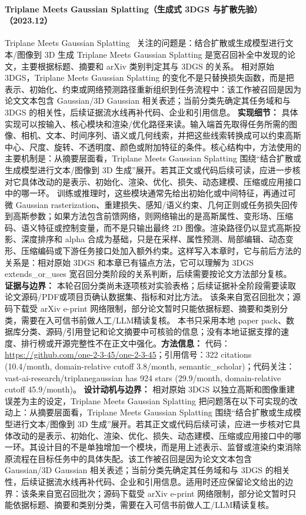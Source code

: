\paragraph{Triplane Meets Gaussian Splatting（生成式 3DGS 与扩散先验）（2023.12）}
Triplane Meets Gaussian Splatting~\cite{2312_09147} 关注的问题是：结合扩散或生成模型进行文本/图像到 3D 生成 Triplane Meets Gaussian Splatting 是宽召回补全中发现的论文，主要根据标题、摘要和 arXiv 类别判定其与 3DGS 的关系。
相对原始 3DGS，Triplane Meets Gaussian Splatting 的变化不是只替换损失函数，而是把表示、初始化、约束或网络预测路径重新组织到任务流程中：该工作被召回是因为论文文本包含 Gaussian/3D Gaussian 相关表述；当前分类先确定其任务域和与 3DGS 的相关性，后续证据流水线再补代码、企业和引用信息。
\textbf{实现细节：} 具体实现可以按输入、核心模块和渲染/优化路径来读。输入端首先取得任务所需的图像、相机、文本、时间序列、语义或几何线索，并把这些线索转换成可以约束高斯中心、尺度、旋转、不透明度、颜色或附加特征的条件。核心结构中，方法使用的主要机制是：从摘要层面看，Triplane Meets Gaussian Splatting 围绕“结合扩散或生成模型进行文本/图像到 3D 生成”展开。若其正文或代码后续可读，应进一步核对它具体改动的是表示、初始化、渲染、优化、损失、动态建模、压缩或应用接口中的哪一环。 训练或推理时，这些模块通常先给出初始化或中间特征，再通过可微 Gaussian rasterization、重建损失、感知/语义约束、几何正则或任务损失回传到高斯参数；如果方法包含前馈网络，则网络输出的是高斯属性、变形场、压缩码、语义特征或控制变量，而不是只输出最终 2D 图像。渲染路径仍以显式高斯投影、深度排序和 alpha 合成为基础，只是在采样、属性预测、局部编辑、动态变形、压缩编码或下游任务接口处加入额外约束。这样写入本章时，它与前后方法的关系是：相对原始 3DGS 和本章已有锚点方法，它可以理解为 3DGS extends\_or\_uses 宽召回分类阶段的关系判断，后续需要按论文方法部分复核。
\textbf{证据与边界：} 本轮召回分类尚未逐项核对实验表格；后续证据补全阶段需要读取论文源码/PDF或项目页确认数据集、指标和对比方法。 该条来自宽召回批次；源码下载受 arXiv e-print 网络限制，部分论文暂时只能依据标题、摘要和类别分类，需要在入可信书前做人工/LLM精读复核。 本书只采用本地 paper pack、数据库分类、源码/引用登记和论文摘要中可核验的信息；没有本地证据支撑的速度、排行榜或开源完整性不在正文中强化。\textbf{方法信息：} 代码：\url{https://github.com/one-2-3-45/one-2-3-45}；引用信号：322 citations (10.4/month, domain-relative cutoff 3.8/month, semantic\_scholar)；代码关注：vast-ai-research/triplanegaussian has 924 stars (29.9/month, domain-relative cutoff 45.9/month)。
\textbf{设计动机与边界：} 相对原始 3DGS 以独立高斯和图像重建误差为主的设定，Triplane Meets Gaussian Splatting 把问题落在以下可实现的改动上：从摘要层面看，Triplane Meets Gaussian Splatting 围绕“结合扩散或生成模型进行文本/图像到 3D 生成”展开。若其正文或代码后续可读，应进一步核对它具体改动的是表示、初始化、渲染、优化、损失、动态建模、压缩或应用接口中的哪一环。其设计目的不是单独增加一个模块，而是用上述表示、监督或渲染约束消除原流程在目标任务中的具体失配。该工作被召回是因为论文文本包含 Gaussian/3D Gaussian 相关表述；当前分类先确定其任务域和与 3DGS 的相关性，后续证据流水线再补代码、企业和引用信息。适用时还应保留论文给出的边界：该条来自宽召回批次；源码下载受 arXiv e-print 网络限制，部分论文暂时只能依据标题、摘要和类别分类，需要在入可信书前做人工/LLM精读复核。
